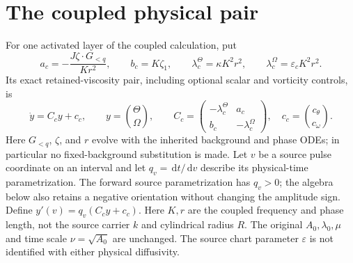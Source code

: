 \documentclass[11pt]{article}
\newcommand{\dd}{\,\mathrm d}
\begin{document}
\section{The coupled physical pair}
For one activated layer of the coupled calculation, put
\begin{equation}
 a_c=-\frac{J\zeta\cdot G_{<q}}{Kr^2},\qquad b_c=K\zeta_1,\qquad
 \lambda_c^\Theta=\kappa K^2r^2,\qquad \lambda_c^\Omega=\varepsilon_c K^2r^2.
\end{equation}
Its exact retained-viscosity pair, including optional scalar and vorticity
controls, is
\begin{equation}
 \dot y=C_cy+c_c,\qquad y=\binom{\Theta}{\Omega},\qquad
 C_c=\begin{pmatrix}-\lambda_c^\Theta&a_c\\b_c&-\lambda_c^\Omega\end{pmatrix},\quad
 c_c=\binom{c_\theta}{c_\omega}.
 \label{nsbridge:eq:coupledpair}
\end{equation}
Here $G_{<q}$, $\zeta$, and $r$ evolve with the inherited background and phase
ODEs; in particular no fixed-background substitution is made.  Let $v$ be a
source pulse coordinate on an interval and let $q_v=\dd t/\dd v$ describe
its physical-time parametrization. The forward source parametrization has
$q_v>0$; the algebra below also retains a negative orientation without
changing the amplitude sign. Define $y'(v)=q_v(C_cy+c_c)$.
Here $K,r$ are the coupled frequency and phase length, not the source
carrier $k$ and cylindrical radius $R$. The original $A_0,\lambda_0,\mu$
and time scale $\nu=\sqrt{A_0}$ are unchanged. The source chart parameter
$\varepsilon$ is not identified with either physical diffusivity.
\end{document}

